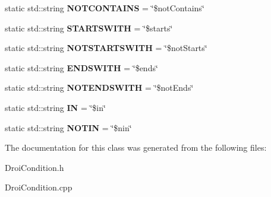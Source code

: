 \begin{DoxyCompactItemize}
\item 
\mbox{\label{class_droi_condition_a719ca242d28ee260f940ce23989923d2}} 
static std\+::string {\bfseries N\+O\+T\+C\+O\+N\+T\+A\+I\+NS} = \char`\"{}\$not\+Contains\char`\"{}
\item 
\mbox{\label{class_droi_condition_adf6babb00e2b1ea9ebbf31eefbd2f5a6}} 
static std\+::string {\bfseries S\+T\+A\+R\+T\+S\+W\+I\+TH} = \char`\"{}\$starts\char`\"{}
\item 
\mbox{\label{class_droi_condition_a241043c1990894b6df40799bc2f14c4d}} 
static std\+::string {\bfseries N\+O\+T\+S\+T\+A\+R\+T\+S\+W\+I\+TH} = \char`\"{}\$not\+Starts\char`\"{}
\item 
\mbox{\label{class_droi_condition_a2df0aa06e6ac44f98a9515310236c069}} 
static std\+::string {\bfseries E\+N\+D\+S\+W\+I\+TH} = \char`\"{}\$ends\char`\"{}
\item 
\mbox{\label{class_droi_condition_abdd5abef391c8c5801e4f55ec40d11d9}} 
static std\+::string {\bfseries N\+O\+T\+E\+N\+D\+S\+W\+I\+TH} = \char`\"{}\$not\+Ends\char`\"{}
\item 
\mbox{\label{class_droi_condition_a8929dfcf65a9590e3efbe74781af5cb7}} 
static std\+::string {\bfseries IN} = \char`\"{}\$in\char`\"{}
\item 
\mbox{\label{class_droi_condition_a6eeb5f60944b20354647e841654ba167}} 
static std\+::string {\bfseries N\+O\+T\+IN} = \char`\"{}\$nin\char`\"{}
\end{DoxyCompactItemize}


The documentation for this class was generated from the following files\+:\begin{DoxyCompactItemize}
\item 
Droi\+Condition.\+h\item 
Droi\+Condition.\+cpp\end{DoxyCompactItemize}

